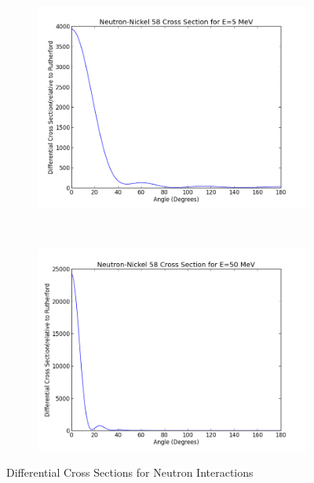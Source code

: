 \documentclass[paper=a4, fontsize=11pt]{scrartcl} %
\numberwithin{equation}{section} %
\numberwithin{figure}{section} %
\numberwithin{table}{section} %
\begin{document}
 \begin{figure}[hbt]
        \centering
        \begin{subfigure}[b!]{0.45\textwidth}
                \includegraphics[width=\textwidth]{NeutronNi5.png}
        \end{subfigure}%
        ~ %
\quad
        \begin{subfigure}[b!]{0.45\textwidth}
                \includegraphics[width=\textwidth]{NeutronNi50.png}
        \end{subfigure}

        \caption{Differential Cross Sections for Neutron Interactions}
\end{figure}
\end{document}
